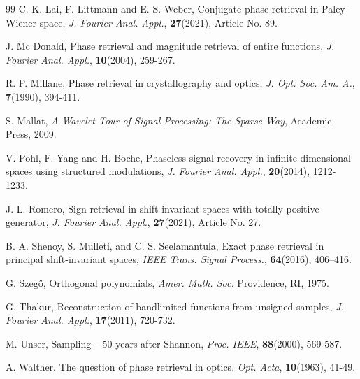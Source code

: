\documentclass[11pt,oneside,reqno]{amsart}
\numberwithin{equation}{section}
\begin{document}
\begin{thebibliography}{99}
C. K. Lai, F. Littmann and E. S. Weber, Conjugate phase retrieval in Paley-Wiener space, {\em J. Fourier Anal. Appl.},  {\bf 27}(2021), Article No. 89.

J. Mc Donald, Phase retrieval and magnitude retrieval of entire functions, {\em J. Fourier Anal. Appl.}, {\bf 10}(2004), 259-267.



 R. P. Millane, Phase retrieval in crystallography and optics,
{\em  J. Opt. Soc. Am. A.}, {\bf 7}(1990), 394-411.

	


 S. Mallat, {\em  A Wavelet Tour of Signal Processing: The Sparse Way},
Academic Press, 2009.

	




 V. Pohl, F. Yang and H. Boche, Phaseless signal recovery in infinite dimensional
spaces using structured modulations, {\em J. Fourier Anal. Appl.}, {\bf 20}(2014), 1212-1233.


 J. L. Romero, Sign retrieval in shift-invariant spaces with  totally positive generator, {\em J.  Fourier Anal. Appl.}, {\bf 27}(2021), Article No. 27.

	
	B. A. Shenoy, S. Mulleti, and C. S. Seelamantula, Exact phase retrieval in principal shift-invariant spaces, \emph{IEEE Trans. Signal Process.}, {\bf 64}(2016), 406--416.


  G. Szeg\H{o}, Orthogonal polynomials, {\em Amer. Math. Soc.}  Providence, RI, 1975.


 G. Thakur, Reconstruction of bandlimited functions from unsigned samples,   {\em J.  Fourier Anal. Appl.}, {\bf 17}(2011), 720-732.

  M. Unser, Sampling -- 50 years after Shannon, {\em Proc. IEEE}, {\bf 88}(2000), 569-587.


	A. Walther. The question of phase retrieval in optics. \emph{Opt. Acta}, {\bf 10}(1963), 41-49.
	



\end{thebibliography}
\end{document}
